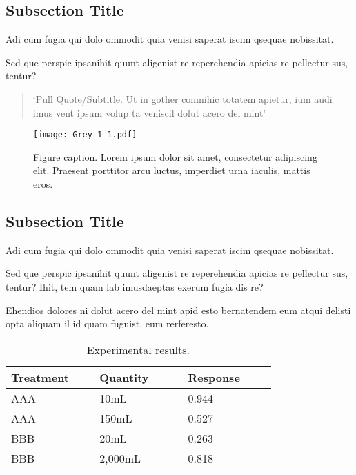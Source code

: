 \documentclass[
]{ImperialPoster}
\begin{document}
\begin{multicols}{3} %


	\subsection{Subsection Title}

	Adi cum fugia qui dolo ommodit quia venisi saperat iscim qsequae nobissitat.

	Sed que perspic ipsanihit quunt aligenist re reperehendia \textcolor{ICLBlue}{apicias re pellectur sus, tentur?}

	\begin{quote}
		`Pull Quote/Subtitle. Ut in gother comnihic totatem apietur, ium audi imus vent ipsum volup ta veniscil dolut acero del mint'
	\end{quote}

	\begin{figure}[H] %
		\texttt{[image: Grey\_1-1.pdf]} %
		\caption{Figure caption. Lorem ipsum dolor sit amet, consectetur adipiscing elit. Praesent porttitor arcu luctus, imperdiet urna iaculis, mattis eros.}
	\end{figure}

	\subsection{Subsection Title}

	Adi cum fugia qui dolo ommodit quia venisi saperat iscim qsequae nobissitat.

	Sed que perspic ipsanihit quunt aligenist re reperehendia apicias re pellectur sus, tentur? Ihit, tem quam lab imusdaeptas exerum fugia dis re?

	Ehendios dolores ni dolut acero del mint apid esto bernatendem eum atqui delisti opta aliquam il id quam fuguist, eum rerferesto.

	\begin{table}[H] %
		\caption{Experimental results.}
		\begin{tabular}{L{0.26\linewidth} C{0.26\linewidth} R{0.26\linewidth}}
			\toprule
			Treatment & Quantity & Response\\
			\midrule
			AAA & 10mL & 0.944\\
			AAA & 150mL & 0.527\\
			BBB & 20mL & 0.263\\
			BBB & 2,000mL & 0.818\\
			\bottomrule
		\end{tabular}
	\end{table}


\end{multicols}
\end{document}

